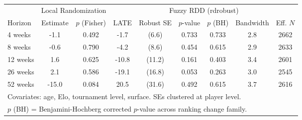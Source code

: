 \begin{tabular}{lcc|cccccc}
\toprule
 & \multicolumn{2}{c|}{Local Randomization} & \multicolumn{6}{c}{Fuzzy RDD (rdrobust)} \\
\cmidrule(lr){2-3} \cmidrule(lr){4-9}
Horizon & Estimate & $p$ (Fisher) & LATE & Robust SE & $p$-value & $p$ (BH) & Bandwidth & Eff. $N$ \\
\midrule
4 weeks & -1.1 & 0.492 & -1.7 & (6.6) & 0.733 & 0.733 & 2.8 & 2662 \\
8 weeks & -0.6 & 0.790 & -4.2 & (8.6) & 0.454 & 0.615 & 2.9 & 2633 \\
12 weeks & 1.6 & 0.625 & -10.8 & (11.2) & 0.161 & 0.403 & 3.4 & 2601 \\
26 weeks & 2.1 & 0.586 & -19.1 & (16.8) & 0.053 & 0.263 & 3.0 & 2545 \\
52 weeks & -15.0 & 0.084 & 20.5 & (31.6) & 0.492 & 0.615 & 3.7 & 2616 \\
\midrule
\multicolumn{9}{l}{\footnotesize Covariates: age, Elo, tournament level, surface. SEs clustered at player level.} \\
\multicolumn{9}{l}{\footnotesize $p$ (BH) = Benjamini-Hochberg corrected $p$-value across ranking change family.} \\
\bottomrule
\end{tabular}
